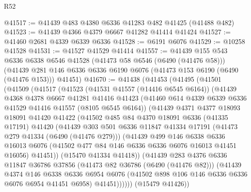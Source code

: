 \begin{lexlean}{R52}
\begin{coremodule}
@41517 := @41439 @483 @4380 @6336 @41283 @482 @41425 (@41488 @482)
@41523 := @41439 @4366 @4379 @6667 @41282 @41414 @41424
@41527 := @41460 @2681 @4339 @6339 @6336
@41528 := @6191 @6076
@41529 := @10258 @41528
@41531 := @41527 @41529 @41414
@41557 := @41439
    @155
    @543
    @6336
    @6338
    @6546
    @41528
    (@41473 @58 @6546 (@6490 (@41476 @58)))
    (@41439 @281 @146 @6336 @6336 @6190 @6076 (@41473 @153 @6190 (@6490 (@41476 @153))) @41451)
@41670 := @41438
    (@41453
      (@41495
        (@41501
          (@41509
            (@41517
              (@41523
                (@41531 @41557 (@14416 @6545 @6164))
                (@41439
                  @4368
                  @4378
                  @6667
                  @41281
                  @41416
                  @41423
                  (@41460 @614 @4339 @6339 @6336 @41529 @41416 @41557 (@8105 @6545 @6164))
                  (@41439
                    @4371
                    @4377
                    @18093
                    @18091
                    @41420
                    @41422
                    (@41502
                      @485
                      @84
                      @4370
                      @18091
                      @6336
                      (@41335 @17191)
                      @41420
                      (@41439
                        @303
                        @501
                        @6336
                        @11847
                        @41334
                        @17191
                        (@41473 @279 @41334 (@6490 (@41476 @279)))
                        (@41439
                          @499
                          @146
                          @6338
                          @6336
                          @16013
                          @6076
                          (@41502 @477 @84 @146 @6336 @6336 @6076 @16013 @41451 @16056)
                          @41451))
                      (@15470 @41334 @41418))
                    (@41439
                      @283
                      @4376
                      @6336
                      @11847
                      @36786
                      @37856
                      (@41473 @82 @36786 (@6490 (@41476 @82)))
                      (@41439
                        @4374
                        @146
                        @6338
                        @6336
                        @6954
                        @6076
                        (@41502 @898 @106 @146 @6336 @6336 @6076 @6954 @41451 @6958)
                        @41451))))))
            (@15479 @41426))

\end{coremodule}
\end{lexlean}

